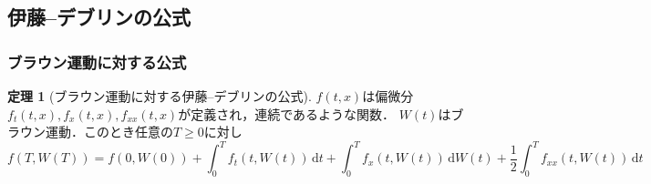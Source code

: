 \documentclass[a4paper, lualatex, ja=standard]{bxjsarticle}
\theoremstyle{definition}
\newtheorem{thm}{定理}[subsection]
\newcommand{\diff}{\mathrm{d}}
\begin{document}
\subsection{伊藤--デブリンの公式}
\subsubsection{ブラウン運動に対する公式}
\setcounter{equation}{2}
\begin{thm}[ブラウン運動に対する伊藤--デブリンの公式]
  $f(t,x)$は偏微分$f_t(t,x),f_x(t,x),f_{xx}(t,x)$が定義され，連続であるような関数．
  $W(t)$はブラウン運動．このとき任意の$T\geq0$に対し
  \begin{equation}
    f(T,W(T)) = f(0,W(0)) + \int_0^T f_t(t,W(t))\,\diff t + \int_0^T f_x(t,W(t))\,\diff W(t) + \frac{1}{2}\int_0^T f_{xx}(t,W(t))\,\diff t
  \end{equation}
\end{thm}
\end{document}
